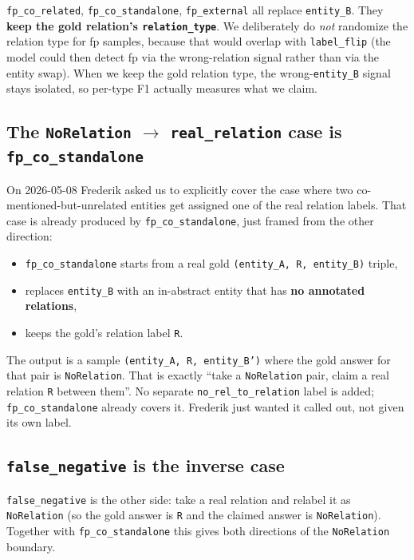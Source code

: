 \documentclass[11pt,a4paper]{article}
\newcommand{\code}[1]{\texttt{#1}}
\begin{document}
\code{fp\_co\_related}, \code{fp\_co\_standalone}, \code{fp\_external} all replace \code{entity\_B}. They \textbf{keep the gold relation's \code{relation\_type}}. We deliberately do \emph{not} randomize the relation type for fp samples, because that would overlap with \code{label\_flip} (the model could then detect fp via the wrong-relation signal rather than via the entity swap). When we keep the gold relation type, the wrong-\code{entity\_B} signal stays isolated, so per-type F1 actually measures what we claim.

\subsection*{The \code{NoRelation} $\to$ \code{real\_relation} case is \code{fp\_co\_standalone}}

On 2026-05-08 Frederik asked us to explicitly cover the case where two co-mentioned-but-unrelated entities get assigned one of the real relation labels. That case is already produced by \code{fp\_co\_standalone}, just framed from the other direction:

\begin{itemize}
\item \code{fp\_co\_standalone} starts from a real gold \code{(entity\_A, R, entity\_B)} triple,
\item replaces \code{entity\_B} with an in-abstract entity that has \textbf{no annotated relations},
\item keeps the gold's relation label \code{R}.
\end{itemize}

\noindent
The output is a sample \code{(entity\_A, R, entity\_B')} where the gold answer for that pair is \code{NoRelation}. That is exactly ``take a \code{NoRelation} pair, claim a real relation \code{R} between them''. No separate \code{no\_rel\_to\_relation} label is added; \code{fp\_co\_standalone} already covers it. Frederik just wanted it called out, not given its own label.

\subsection*{\code{false\_negative} is the inverse case}

\code{false\_negative} is the other side: take a real relation and relabel it as \code{NoRelation} (so the gold answer is \code{R} and the claimed answer is \code{NoRelation}). Together with \code{fp\_co\_standalone} this gives both directions of the \code{NoRelation} boundary.
\end{document}
